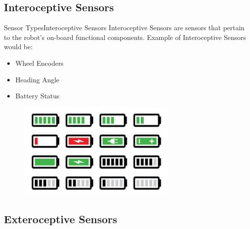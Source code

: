 \documentclass{beamer}
\begin{document}
\subsection{Interoceptive Sensors}

\begin{frame}{Sensor Types}{Interoceptive Sensors}
Interoceptive Sensors are sensors that pertain to the robot's on-board functional components. Example of Interoceptive Sensors would be:

\begin{itemize}
\item Wheel Encoders
\item Heading Angle
\item Battery Status
\end{itemize}

\begin{figure}
\centering
\includegraphics[scale=0.5]{figs/img/Lu_Images/batteryStatus}
\end{figure}
  
\end{frame}

\subsection{Exteroceptive Sensors}
\end{document}
